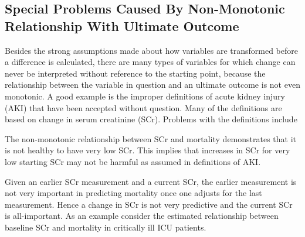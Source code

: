 \subsection{Special Problems Caused By Non-Monotonic Relationship With Ultimate Outcome}
Besides the strong assumptions made about how variables are
transformed before a difference is calculated, there are many types of
variables for which change can never be interpreted without reference
to the starting point, because the relationship between the variable
in question and an ultimate outcome is not even monotonic.  A good
example is the improper definitions of acute kidney injury (AKI) that have
been accepted without question.  Many of the definitions are based on
change in serum creatinine (SCr).  Problems with the definitions include
\be
\item The non-monotonic relationship between SCr and mortality demonstrates that it is not healthy to have very low SCr.  This implies that increases in SCr for very low starting SCr may not be harmful as assumed in definitions of AKI.
\item Given an earlier SCr measurement and a current SCr, the earlier measurement is not very important in predicting mortality once one adjusts for the last measurement.  Hence a change in SCr is not very predictive and the current SCr is all-important.
\ee
As an example consider the estimated relationship between baseline SCr
and mortality in critically ill ICU patients.
